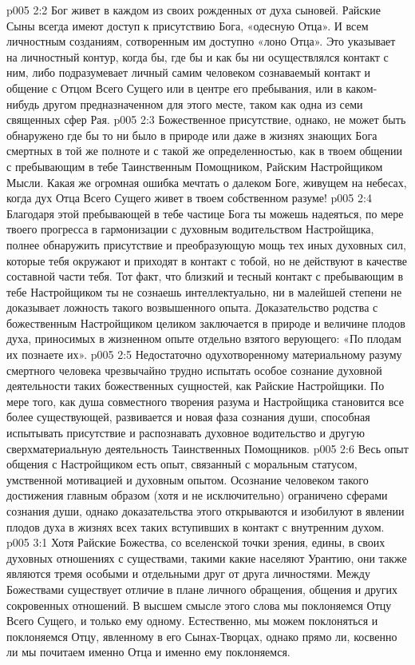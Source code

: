 \vs p005 2:2 Бог живет в каждом из своих рожденных от духа сыновей. Райские Сыны всегда имеют доступ к присутствию Бога, «одесную Отца». И всем личностным созданиям, сотворенным им доступно «лоно Отца». Это указывает на личностный контур, когда бы, где бы и как бы ни осуществлялся контакт с ним, либо подразумевает личный самим человеком сознаваемый контакт и общение с Отцом Всего Сущего или в центре его пребывания, или в каком\hyp{}нибудь другом предназначенном для этого месте, таком как одна из семи священных сфер Рая.
\vs p005 2:3 Божественное присутствие, однако, не может быть обнаружено где бы то ни было в природе или даже в жизнях знающих Бога смертных в той же полноте и с такой же определенностью, как в твоем общении с пребывающим в тебе Таинственным Помощником, Райским Настройщиком Мысли. Какая же огромная ошибка мечтать о далеком Боге, живущем на небесах, когда дух Отца Всего Сущего живет в твоем собственном разуме!
\vs p005 2:4 \pc Благодаря этой пребывающей в тебе частице Бога ты можешь надеяться, по мере твоего прогресса в гармонизации с духовным водительством Настройщика, полнее обнаружить присутствие и преобразующую мощь тех иных духовных сил, которые тебя окружают и приходят в контакт с тобой, но не действуют в качестве составной части тебя. Тот факт, что близкий и тесный контакт с пребывающим в тебе Настройщиком ты не сознаешь интеллектуально, ни в малейшей степени не доказывает ложность такого возвышенного опыта. Доказательство родства с божественным Настройщиком целиком заключается в природе и величине плодов духа, приносимых в жизненном опыте отдельно взятого верующего: «По плодам их познаете их».
\vs p005 2:5 Недостаточно одухотворенному материальному разуму смертного человека чрезвычайно трудно испытать особое сознание духовной деятельности таких божественных сущностей, как Райские Настройщики. По мере того, как душа совместного творения разума и Настройщика становится все более существующей, развивается и новая фаза сознания души, способная испытывать присутствие и распознавать духовное водительство и другую сверхматериальную деятельность Таинственных Помощников.
\vs p005 2:6 Весь опыт общения с Настройщиком есть опыт, связанный с моральным статусом, умственной мотивацией и духовным опытом. Осознание человеком такого достижения главным образом (хотя и не исключительно) ограничено сферами сознания души, однако доказательства этого открываются и изобилуют в явлении плодов духа в жизнях всех таких вступивших в контакт с внутренним духом.
\vs p005 3:1 Хотя Райские Божества, со вселенской точки зрения, едины, в своих духовных отношениях с существами, такими какие населяют Урантию, они также являются тремя особыми и отдельными друг от друга личностями. Между Божествами существует отличие в плане личного обращения, общения и других сокровенных отношений. В высшем смысле этого слова мы поклоняемся Отцу Всего Сущего, и только ему одному. Естественно, мы можем поклоняться и поклоняемся Отцу, явленному в его Сынах\hyp{}Творцах, однако прямо ли, косвенно ли мы почитаем именно Отца и именно ему поклоняемся.
